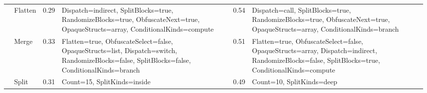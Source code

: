 \begin{table*}[!hp]
\begin{footnotesize}
\begin{tabular}{|p{1.5cm}|l|l|p{5cm}|l|p{5cm}|}
                                                                               & Flatten                                                                & 0.29                                                    &  Dispatch=indirect, SplitBlocks=true, RandomizeBlocks=true, ObfuscateNext=true, OpaqueStructs=array, ConditionalKinds=compute                                                            & 0.54                                                    &  Dispatch=call, SplitBlocks=true, RandomizeBlocks=true, ObfuscateNext=true, OpaqueStructs=array, ConditionalKinds=branch                                                                     \\ \cline{2-6} 
                                                                               & Merge                                                                  & 0.33                                                    &  Flatten=true, ObfuscateSelect=false, OpaqueStructs=list, Dispatch=switch, RandomizeBlocks=false, SplitBlocks=false, ConditionalKinds=branch                                             & 0.51                                                    &  Flatten=true, ObfuscateSelect=false, OpaqueStructs=array, Dispatch=indirect, RandomizeBlocks=false, SplitBlocks=true, ConditionalKinds=compute                                              \\ \cline{2-6} 
                                                                               & Split                                                                  & 0.31                                                    &  Count=15, SplitKinds=inside                                                                                                                                                             & 0.49                                                    &  Count=10, SplitKinds=deep                                                                                                                                                                   \\ \cline{2-6} 
                                                                              
\hline
\end{tabular}
\end{footnotesize}
\end{table*}
